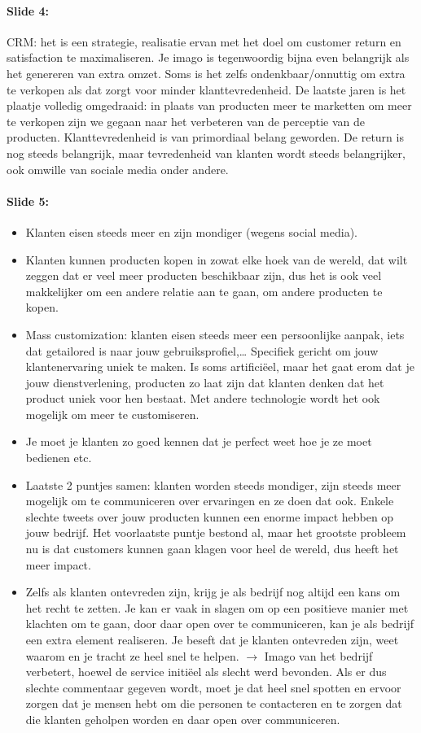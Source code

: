 \documentclass[10pt,a4paper]{report}
\begin{document}
\paragraph{Slide 4:}CRM: het is een strategie, realisatie ervan met het doel om customer return en satisfaction te maximaliseren. Je imago is tegenwoordig bijna even belangrijk als het genereren van extra omzet. Soms is het zelfs ondenkbaar/onnuttig om extra te verkopen als dat zorgt voor minder klanttevredenheid. De laatste jaren is het plaatje volledig omgedraaid: in plaats van producten meer te marketten om meer te verkopen zijn we gegaan naar het verbeteren van de perceptie van de producten. Klanttevredenheid is van primordiaal belang geworden.
De return is nog steeds belangrijk, maar tevredenheid van klanten wordt steeds belangrijker, ook omwille van sociale media onder andere.

\paragraph{Slide 5: }
\begin{itemize}
\item Klanten eisen steeds meer en zijn mondiger (wegens social media). 
\item Klanten kunnen producten kopen in zowat elke hoek van de wereld, dat wilt zeggen dat er veel meer producten beschikbaar zijn, dus het is ook veel makkelijker om een andere relatie aan te gaan, om andere producten te kopen.
\item Mass customization: klanten eisen steeds meer een persoonlijke aanpak, iets dat getailored is naar jouw gebruiksprofiel,… Specifiek gericht om jouw klantenervaring uniek te maken. Is soms artificiëel, maar het gaat erom dat je jouw dienstverlening, producten zo laat zijn dat klanten denken dat het product uniek voor hen bestaat. Met andere technologie wordt het ook mogelijk om meer te customiseren.
\item Je moet je klanten zo goed kennen dat je perfect weet hoe je ze moet bedienen etc.
\item Laatste 2 puntjes samen: klanten worden steeds mondiger, zijn steeds meer mogelijk om te communiceren over ervaringen en ze doen dat ook. Enkele slechte tweets over jouw producten kunnen een enorme impact hebben op jouw bedrijf. Het voorlaatste puntje bestond al, maar het grootste probleem nu is dat customers kunnen gaan klagen voor heel de wereld, dus heeft het meer impact.
\item Zelfs als klanten ontevreden zijn, krijg je als bedrijf nog altijd een kans om het recht te zetten. Je kan er vaak in slagen om op een positieve manier met klachten om te gaan, door daar open over te communiceren, kan je als bedrijf een extra element realiseren. Je beseft dat je klanten ontevreden zijn, weet waarom en je tracht ze heel snel te helpen. $\rightarrow$ Imago van het bedrijf verbetert, hoewel de service initiëel als slecht werd bevonden. Als er dus slechte commentaar gegeven wordt, moet je dat heel snel spotten en ervoor zorgen dat je mensen hebt om die personen te contacteren en te zorgen dat die klanten geholpen worden en daar open over communiceren.
\end{itemize}
\end{document}
